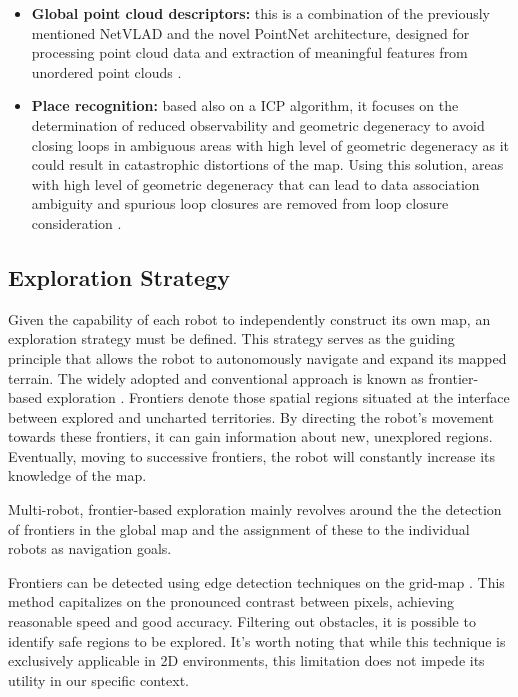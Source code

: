 \begin{itemize}
    \item \textbf{Global point cloud descriptors:} this is a combination of the previously mentioned NetVLAD and the novel  PointNet architecture, designed for processing point cloud data and extraction of meaningful features from unordered point clouds \cite{uy2018pointnetvlad}. 

    \item \textbf{Place recognition:} based also on a ICP algorithm, it focuses on the determination of reduced observability and geometric degeneracy to avoid closing loops in ambiguous areas with high level of geometric degeneracy as it could result in catastrophic distortions of the map. Using this solution, areas with high level of geometric degeneracy that can lead to data association ambiguity and spurious loop closures are removed from loop closure consideration \cite{ebadi2021dare}.

\end{itemize}




\subsection{Exploration Strategy}
\label{sec:literature_exploration}

Given the capability of each robot to independently construct its own map, an exploration strategy must be defined.  This strategy serves as the guiding principle that allows the robot to autonomously navigate and expand its mapped terrain.
The widely adopted and conventional approach is known as frontier-based exploration \cite{frontier_based}. Frontiers denote those spatial regions situated at the interface between explored and uncharted territories. By directing the robot's movement towards these frontiers, it can gain information about new, unexplored regions. Eventually, moving to successive frontiers, the robot will constantly increase its knowledge of the map.

Multi-robot, frontier-based exploration mainly revolves around the the detection of frontiers in the global map and the assignment of these to the individual robots as navigation goals.

Frontiers can be detected using edge detection techniques on the grid-map \cite{frontier_based}. This method capitalizes on the pronounced contrast between pixels, achieving reasonable speed and good accuracy. Filtering out obstacles, it is possible to identify safe regions to be explored. It's worth noting that while this technique is exclusively applicable in 2D environments, this limitation does not impede its utility in our specific context.

